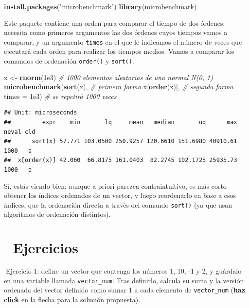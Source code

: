\documentclass[11pt,]{book}
\newenvironment{Shaded}{\begin{snugshade}}{\end{snugshade}}
\newcommand{\CommentTok}[1]{\textcolor[rgb]{0.37,0.37,0.37}{\textit{#1}}}
\newcommand{\DataTypeTok}[1]{\textcolor[rgb]{0.27,0.27,0.27}{#1}}
\newcommand{\FloatTok}[1]{\textcolor[rgb]{0.06,0.06,0.06}{#1}}
\newcommand{\KeywordTok}[1]{\textcolor[rgb]{0.27,0.27,0.27}{\textbf{#1}}}
\newcommand{\NormalTok}[1]{#1}
\newcommand{\StringTok}[1]{\textcolor[rgb]{0.5,0.5,0.5}{#1}}
\begin{document}
\begin{Shaded}
\begin{Highlighting}[]
\KeywordTok{install.packages}\NormalTok{(}\StringTok{"microbenchmark"}\NormalTok{)}
\KeywordTok{library}\NormalTok{(microbenchmark)}
\end{Highlighting}
\end{Shaded}

Este paquete contiene una orden para comparar el tiempo de dos órdenes: necesita como primeros argumentos las dos órdenes cuyos tiempos vamos a comparar, y un argumento \texttt{times} en el que le indicamos el número de veces que ejecutará cada orden para realizar los tiempos medios. Vamos a comparar los comandos de ordenación \texttt{order()} y \texttt{sort()}.

\begin{Shaded}
\begin{Highlighting}[]
\NormalTok{x <-}\StringTok{ }\KeywordTok{rnorm}\NormalTok{(}\FloatTok{1e3}\NormalTok{) }\CommentTok{# 1000 elementos aleatorias de una normal N(0, 1)}
\KeywordTok{microbenchmark}\NormalTok{(}\KeywordTok{sort}\NormalTok{(x), }\CommentTok{# primera forma}
\NormalTok{               x[}\KeywordTok{order}\NormalTok{(x)], }\CommentTok{# segunda forma}
               \DataTypeTok{times =} \FloatTok{1e3}\NormalTok{) }\CommentTok{# se repetirá 1000 veces}
\end{Highlighting}
\end{Shaded}

\begin{verbatim}
## Unit: microseconds
##         expr    min       lq     mean   median       uq      max neval cld
##      sort(x) 57.771 103.0500 250.9257 120.6610 151.6980 40910.61  1000   a
##  x[order(x)] 42.060  66.8175 161.0403  82.2745 102.1725 25935.73  1000   a
\end{verbatim}

Sí, estás viendo bien: aunque a priori parezca contraintuitivo, es más corto obtener los índices ordenados de un vector, y luego reordenarlo en base a esos índices, que la ordenación directa a través del comando \texttt{sort()} (ya que usan algoritmos de ordenación distintos).

\hypertarget{ejercicios-1}{%
\section{📝 Ejercicios}\label{ejercicios-1}}

📝Ejercicio 1: define un vector que contenga los números 1, 10, -1 y 2, y guárdalo en una variable llamada \texttt{vector\_num}. Tras definirlo, calcula su suma y la versión ordenada del vector definido como sumar 1 a cada elemento de \texttt{vector\_num} (\textbf{haz click} en la flecha para la solución propuesta).
\end{document}
